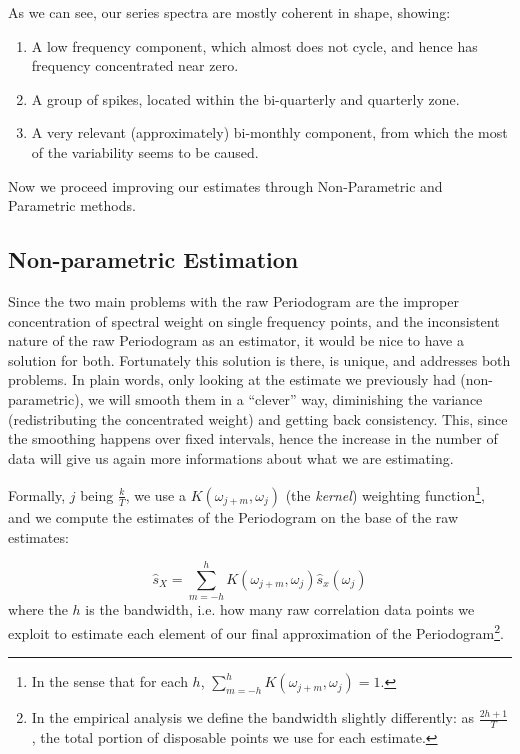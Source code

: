 \documentclass[12pt]{article} %
\begin{document}
As we can see, our series spectra are mostly coherent in shape, showing:

\begin{enumerate}
\item A low frequency component, which almost does not cycle, and hence has frequency concentrated near zero.
\item A group of spikes, located within the bi-quarterly and quarterly zone.
\item A very relevant (approximately) bi-monthly component, from which the most of the variability seems to be caused.
\end{enumerate}

Now we proceed improving our estimates through Non-Parametric and Parametric methods.

\subsection{Non-parametric Estimation}

Since the two main problems with the raw Periodogram are the improper concentration of spectral weight on single frequency points, and the inconsistent nature of the raw Periodogram as an estimator, it would be nice to have a solution for both. Fortunately this solution is there, is unique, and addresses both problems. In plain words, only looking at the estimate we previously had (non-parametric), we will smooth them in a ``clever'' way, diminishing the variance (redistributing the concentrated weight) and getting back consistency.   This, since the smoothing happens over fixed intervals, hence the increase in the number of data will give us again more informations about what we are estimating.

Formally, $j$ being $\frac{k}{T}$, we use a $K(\omega_{j+m},\omega_j)$ (the {\em kernel}) weighting function\footnote{
In the sense that for each $h$, $\sum_{m=-h}^{h}K(\omega_{j+m},\omega_j)=1$.}, and we compute the estimates of the Periodogram on the base of the raw estimates:

\begin{equation}
\hat{s}_X=\sum\limits_{m=-h}^{h} K(\omega_{j+m},\omega_j)\hat{s}_x(\omega_j)
\end{equation}where the $h$ is the bandwidth, i.e. how many raw correlation data points we exploit to estimate each element of our final approximation of the Periodogram\footnote{In the empirical analysis we define the bandwidth slightly differently: as $\frac{2h+1}{T}$, the total portion of disposable points we use for each estimate.}. 
\end{document}
